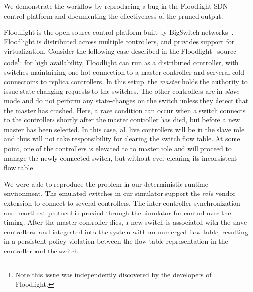 We demonstrate the \simulator{} workflow by reproducing a bug in the Floodlight
SDN control platform and documenting the effectiveness of the pruned output.

Floodlight is the open source control platform built by BigSwitch
networks~\cite{bigswitch}. Floodlight is distributed across multiple
controllers, and provides support for virtualization.
Consider the following case described in the
Floodlight~\cite{floodlight} source code\footnote{Note this issue was
independently discovered by the developers of Floodlight.}: for high availability, Floodlight can run as a
distributed controller, with switches maintaining one hot connection to a master
controller and serveral cold connectoins to replica controllers.
In this setup, the \emph{master} holds the authority to issue state changing requests to the switches.
The other controllers are in \emph{slave} mode and do not perform any
state-changes on the switch unless they detect that the master has crashed.
Here, a race condition can occur when a switch connects
to the controllers shortly after the master controller has died, but
before a new master has been selected. In this case, all live controllers will be in
the slave role and thus will not take responsibility for clearing the switch
flow table. At some point, one of the controllers is elevated to to
master role and will proceed to manage the newly connected switch, but without
ever clearing its inconsistent flow table.

We were able to reproduce the problem in our deterministic runtime environment. The
emulated switches in our simulator support the \emph{role} vendor extension to
connect to several controllers. The inter-controller synchronization and heartbeat
protocol is proxied through the simulator for control over the timing. After the
master controller dies, a new switch is associated with the slave controllers, and
integrated into the system with an unmerged flow-table, resulting in a persistent
policy-violation between the flow-table representation in the controller and the switch.

